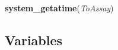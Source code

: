 \hspace{.8\funcindent}\begin{boxedminipage}{\funcwidth}

    \raggedright \textbf{system\_getatime}(\textit{ToAssay})

\setlength{\parskip}{2ex}
\setlength{\parskip}{1ex}
    \end{boxedminipage}



  \subsection{Variables}


